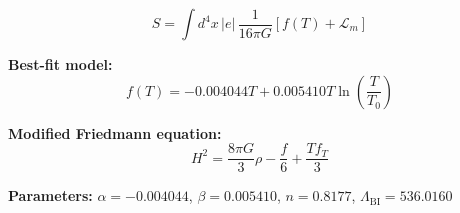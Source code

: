 
\begin{equation}
  S = \int d^4x \, |e| \, \frac{1}{16\pi G} \left[ f(T) + \mathcal{L}_m \right]
\end{equation}

\textbf{Best-fit model:}
\begin{equation}
  f(T) = -0.004044 T + 0.005410 T \ln\!\left(\frac{T}{T_0}\right)
\end{equation}

\textbf{Modified Friedmann equation:}
\begin{equation}
  H^2 = \frac{8\pi G}{3} \rho - \frac{f}{6} + \frac{T f_T}{3}
\end{equation}

\textbf{Parameters:}
$\alpha = -0.004044$, \quad
$\beta = 0.005410$, \quad
$n = 0.8177$, \quad
$\Lambda_{\text{BI}} = 536.0160$